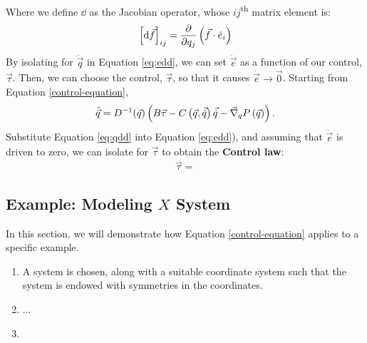 \documentclass[main.tex]{subfiles}
\begin{document}
    Where we define $\dd$ as the Jacobian operator, whose $ij$\textsuperscript{th} matrix element is:
    \begin{align}
        \sbr{\dd \vec f}_{ij}=\pdv{}{q_j}\del{\vec f\cdot\hat{e}_i}
    \end{align}
    By isolating for $\ddot{\vec q}$ in Equation \ref{eq:edd}, we can set $\ddot{\vec{e}}$ as a function of our control, $\vec\tau$. Then, we can choose the control, $\vec\tau$, so that it causes $\ddot{\vec{e}}\to \vec{0}$. Starting from Equation \ref{control-equation},
    \begin{align}
        \ddot{\vec{q}}=D\inv(\vec{q})\del{B\vec{\tau}
        -C\del[1]{\vec q,\vec\qd}\vec\qd-\vec\nabla_qP\del{\vec q}}.\label{eq:qdd}
    \end{align}
    Substitute Equation \ref{eq:qdd} into Equation \ref{eq:edd}), and assuming that $\ddot{\vec{e}}$ is driven to zero, we can isolate for $\vec{\tau}$ to obtain the \textbf{Control law}:
    \begin{align}
        \vec{\tau}=
        
    \end{align}
\subsection{Example: Modeling $X$ System}
In this section, we will demonstrate how Equation \ref{control-equation} applies to a specific example.
\begin{enumerate}[(1)]
    \item A system is chosen, along with a suitable coordinate system such that the system is endowed with symmetries in the coordinates.
    \item ...
    \item 
\end{enumerate}
\end{document}
